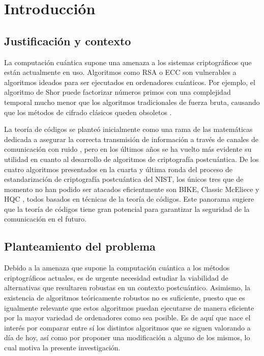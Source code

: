 \newpage{\pagestyle{empty}}
\chapter{Introducción}

\section{Justificación y contexto}

La computación cuántica supone una amenaza a los sistemas criptográficos que están actualmente en uso. Algoritmos como RSA o ECC son vulnerables a algoritmos ideados para ser ejecutados en ordenadores cuánticos. Por ejemplo, el algoritmo de Shor puede factorizar números primos con una complejidad temporal mucho menor que los algoritmos tradicionales de fuerza bruta, causando que los métodos de cifrado clásicos queden obsoletos \autocite{Shor_1997}.

La teoría de códigos se planteó inicialmente como una rama de las matemáticas dedicada a asegurar la correcta transmisión de información a través de canales de comunicación con ruido \autocite{6772729}, pero en los últimos años se ha vuelto más evidente su utilidad en cuanto al desarrollo de algoritmos de criptografía postcuántica. De los cuatro algoritmos presentados en la cuarta y última ronda del proceso de estandarización de criptografía postcuántica del NIST, los únicos tres que de momento no han podido ser atacados eficientmente son BIKE, Classic McEliece y HQC \autocite{NIST8545}, todos basados en técnicas de la teoría de códigos. Este panorama sugiere que la teoría de códigos tiene gran potencial para garantizar la seguridad de la comunicación en el futuro.

\section{Planteamiento del problema}

Debido a la amenaza que supone la computación cuántica a los métodos criptográficos actuales, es de urgente necesidad estudiar la viabilidad de alternativas que resultaren robustas en un contexto postcuántico. Asimismo, la existencia de algoritmos teóricamente robustos no es suficiente, puesto que es igualmente relevante que estos algoritmos puedan ejecutarse de manera eficiente por la mayor variedad de ordenadores como sea posible. Es de aquí que nace el interés por comparar entre sí los distintos algoritmos que se siguen valorando a día de hoy, así como por proponer una modificación a alguno de los mismos, lo cual motiva la presente investigación.

